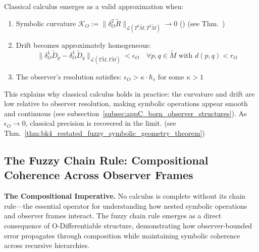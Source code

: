 \begin{scholium} \label{scholium:bk4__beginscholiumemergence_of_classical_cal}

Classical calculus emerges as a valid approximation when:
\begin{enumerate}
\item Symbolic curvature $\mathcal{K}_O := \|\delta^2_O \widetilde{R}\|_{\mathcal{L}(T^2\widetilde{M}, T^2\widetilde{M})} \to 0$ () (see Thm.~)
\item Drift becomes approximately homogeneous:
\[
\|\delta^1_O \widetilde{D}_p - \delta^1_O \widetilde{D}_q\|_{\mathcal{L}(T\widetilde{M}, T\widetilde{M})} < \epsilon_O \quad \forall p,q \in \widetilde{M} \text{ with } d(p,q) < r_O
\]
\item The observer’s resolution satisfies: $\epsilon_O > \kappa \cdot \hbar_s$ for some $\kappa > 1$
\end{enumerate}
This explains why classical calculus holds in practice: the curvature and drift are low relative to observer resolution, making symbolic operations appear smooth and continuous (see subsection~{\ref{subsec:appC_born_observer_structures}}). As $\epsilon_O \to 0$, classical precision is recovered in the limit. (see Thm.~\ref{thm:bk4_restated_fuzzy_symbolic_geometry_theorem})
\end{scholium}
\subsection{The Fuzzy Chain Rule: Compositional Coherence Across Observer Frames}
\label{subsec:bk4_fuzzy_chain_rule}

\textbf{The Compositional Imperative.} No calculus is complete without its chain rule—the essential operator for understanding how nested symbolic operations and observer frames interact. The fuzzy chain rule emerges as a direct consequence of O-Differentiable structure, demonstrating how observer-bounded error propagates through composition while maintaining symbolic coherence across recursive hierarchies.




